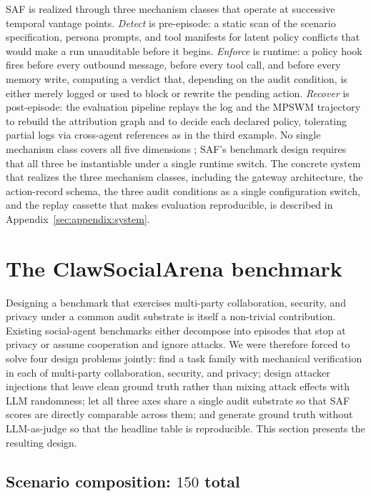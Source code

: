 \documentclass{article}
\begin{document}
SAF is realized through three mechanism classes that operate at successive temporal vantage points. \emph{Detect} is pre-episode: a static scan of the scenario specification, persona prompts, and tool manifests for latent policy conflicts that would make a run unauditable before it begins. \emph{Enforce} is runtime: a policy hook fires before every outbound message, before every tool call, and before every memory write, computing a verdict that, depending on the audit condition, is either merely logged or used to block or rewrite the pending action. \emph{Recover} is post-episode: the evaluation pipeline replays the log and the MPSWM trajectory to rebuild the attribution graph and to decide each declared policy, tolerating partial logs via cross-agent references as in the third example. No single mechanism class covers all five dimensions \citep{nian2026auditable}; SAF's benchmark design requires that all three be instantiable under a single runtime switch. The concrete system that realizes the three mechanism classes, including the gateway architecture, the action-record schema, the three audit conditions as a single configuration switch, and the replay cassette that makes evaluation reproducible, is described in Appendix~\ref{sec:appendix:system}.

\section{The ClawSocialArena benchmark}
\label{sec:bench}

Designing a benchmark that exercises multi-party collaboration, security, and privacy under a common audit substrate is itself a non-trivial contribution. Existing social-agent benchmarks either decompose into episodes that stop at privacy or assume cooperation and ignore attacks. We were therefore forced to solve four design problems jointly: find a task family with mechanical verification in each of multi-party collaboration, security, and privacy; design attacker injections that leave clean ground truth rather than mixing attack effects with LLM randomness; let all three axes share a single audit substrate so that SAF scores are directly comparable across them; and generate ground truth without LLM-as-judge so that the headline table is reproducible. This section presents the resulting design.

\subsection{Scenario composition: $150$ total}
\label{sec:bench:categories}
\end{document}
